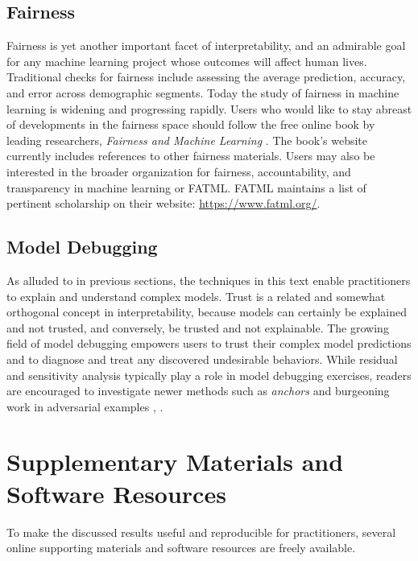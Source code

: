 \documentclass[11pt]{asaproc}
\begin{document}
\subsection{Fairness}

Fairness is yet another important facet of interpretability, and an admirable goal for any machine learning project whose outcomes will affect human lives. Traditional checks for fairness include assessing the average prediction, accuracy, and error across demographic segments. Today the study of fairness in machine learning is widening and progressing rapidly. Users who would like to stay abreast of developments in the fairness space should follow the free online book by leading researchers, \textit{Fairness and Machine Learning} \cite{fairness_book}. The book's website currently includes references to other fairness materials. Users may also be interested in the broader organization for fairness, accountability, and transparency in machine learning or FATML. FATML maintains a list of pertinent scholarship on their website: \url{https://www.fatml.org/}. 

\subsection{Model Debugging}

As alluded to in previous sections, the techniques in this text enable practitioners to explain and understand complex models. Trust is a related and somewhat orthogonal concept in interpretability, because models can certainly be explained and not trusted, and conversely, be trusted and not explainable. The growing field of model debugging empowers users to trust their complex model predictions and to diagnose and treat any discovered undesirable behaviors. While residual and sensitivity analysis typically play a role in model debugging exercises, readers are encouraged to investigate newer methods such as \textit{anchors} and burgeoning work in adversarial examples \cite{anchors}, \cite{adversarial_sameer}. 
 
\section{Supplementary Materials and Software Resources } \label{sec:software}

To make the discussed results useful and reproducible for practitioners, several online supporting materials and software resources are freely available. 
\end{document}
